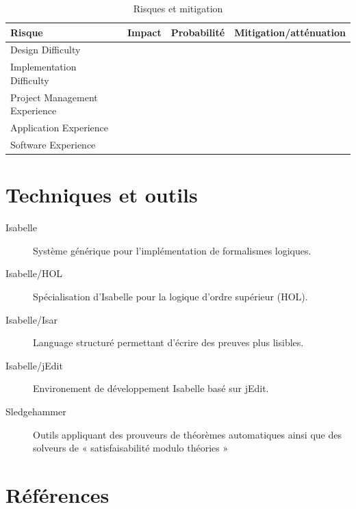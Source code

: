 \documentclass[letterpaper
, twoside
, 12pt
,these
,francais
,creativecommons,hyperref
]{thETS}
\begin{document}
\begin{table}
  \caption{Risques et mitigation}
  \begin{tabular}{|l|l|l|l|}
    \hline
    {\bf Risque} & {\bf Impact} & {\bf Probabilité} & {\bf Mitigation/atténuation} \\
    \hline
    Design Difficulty & & & \\
    \hline
    Implementation Difficulty & & & \\
    \hline
    Project Management Experience & & & \\
    \hline
    Application Experience & & & \\
    \hline
    Software Experience & & & \\
    \hline
  \end{tabular}
\end{table}

\chapter{Techniques et outils}


\begin{description}
  \item[Isabelle] Système générique pour l'implémentation de formalismes logiques.
  \item[Isabelle/HOL] Spécialisation d'Isabelle pour la logique d'ordre supérieur (\gls{HOL}).
  \item[Isabelle/Isar] Language structuré permettant d'écrire des preuves plus lisibles.
  \item[Isabelle/jEdit] Environement de développement Isabelle basé sur jEdit.
  \item[Sledgehammer] Outils appliquant des prouveurs de théorèmes automatiques ainsi que des
    solveurs de « satisfaisabilité modulo théories »
\end{description}

\chapter{Références}



\end{document}

